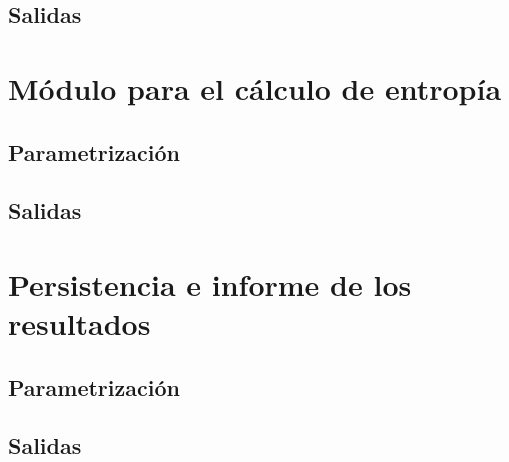 \subsection{Salidas}
\section{Módulo para el cálculo de entropía}
\subsection{Parametrización}
\subsection{Salidas}
\section{Persistencia e informe de los resultados}
\subsection{Parametrización}
\subsection{Salidas}
